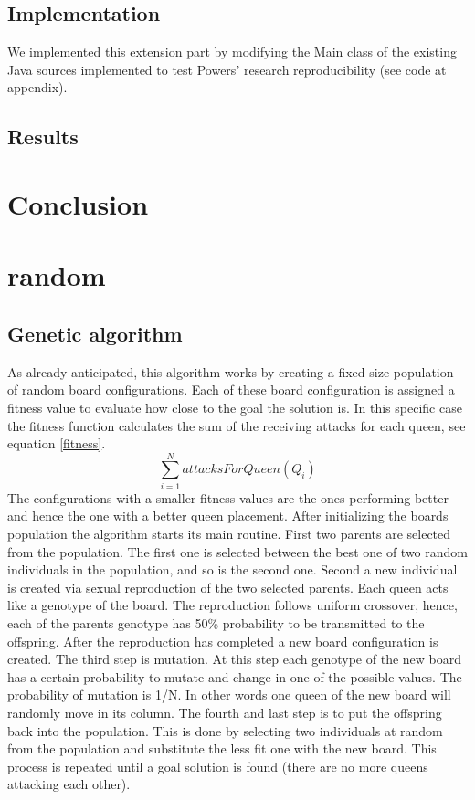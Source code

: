\documentclass[runningheads]{llncs}
\begin{document}
\subsection{Implementation}
We implemented this extension part by modifying the Main class of the
existing Java sources implemented to test Powers' research
reproducibility (see code at appendix). 

\subsection{Results}


\section{Conclusion}





\section{random}
\subsection{Genetic algorithm}
As already anticipated, this algorithm works by creating a fixed size population
of random board configurations. Each of these board configuration is
assigned a fitness value to evaluate how close to the goal the
solution is. In this specific case the fitness function calculates the
sum of the receiving attacks for each queen, see equation \ref{fitness}. 
\begin{equation} \label{fitness}
\sum_{i=1}^{N} attacksForQueen(Q_i)
\end{equation}
The configurations with a smaller fitness values are the ones
performing better and hence the one with a better queen
placement. After initializing the boards population the algorithm
starts its main routine. First two parents are selected from the population. The
first one is selected between the best one of two random individuals
in the population, and so is the second one. Second a new individual
is created via sexual reproduction of the two selected parents. Each
queen acts like a genotype of the board. The reproduction follows
uniform crossover, hence, each of the parents genotype has 50\%
probability to be transmitted to the offspring. After the reproduction
has completed a new board configuration is created. The third step is
mutation. At this step each genotype of the new board has a certain
probability to mutate and change in one of the possible values. The
probability of mutation is 1/N. In other words one queen of the new board
will randomly move in its column. The fourth and last step is to put
the offspring back into the population. This is done by selecting two
individuals at random from the population and substitute the less fit
one with the new board. This process is repeated until a goal solution
is found (there are no more queens attacking each other).
\end{document}
